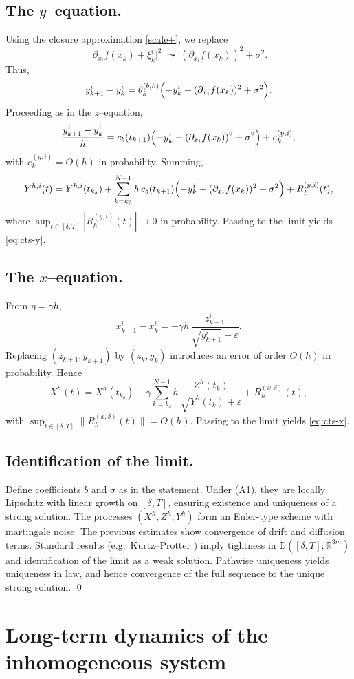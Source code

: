 \documentclass[11pt, a4paper,leqno]{amsart}
\theoremstyle{definition}
\numberwithin{equation}{section}
\begin{document}
\subsection{The $y$–equation.}
Using the closure approximation \eqref{scale+}, we replace
\[
\bigl|\partial_{x_i}f(x_k)+\xi_k^i\bigr|^2
\;\leadsto\;
(\partial_{x_i}f(x_k))^2+\sigma^2.
\]
Thus,
\[
y_{k+1}^i-y_k^i
=
\theta_k^{(b,h)}\Bigl(-y_k^i+(\partial_{x_i}f(x_k))^2+\sigma^2\Bigr).
\]
Proceeding as in the $z$–equation,
\[
\frac{y_{k+1}^i-y_k^i}{h}
=
c_b(t_{k+1})\Bigl(-y_k^i+(\partial_{x_i}f(x_k))^2+\sigma^2\Bigr)
+ e_k^{(y,i)},
\]
with $e_k^{(y,i)}=O(h)$ in probability. Summing,
\[
Y^{h,i}(t)
=
Y^{h,i}(t_{k_\delta})
+\sum_{k=k_\delta}^{N-1} h\,c_b(t_{k+1})\Bigl(-y_k^i+(\partial_{x_i}f(x_k))^2+\sigma^2\Bigr)
+R_h^{(y,i)}(t),
\]
where $\sup_{t\in[\delta,T]}|R_h^{(y,i)}(t)|\to0$ in probability. Passing to the limit yields \eqref{eq:cts-y}.

\subsection{The $x$–equation.}
From $\eta=\gamma h$,
\[
x_{k+1}^i-x_k^i = -\gamma h\,\frac{z_{k+1}^i}{\sqrt{y_{k+1}^i}+\varepsilon}.
\]
Replacing $(z_{k+1},y_{k+1})$ by $(z_k,y_k)$ introduces an error of order $O(h)$ in probability. Hence
\[
X^h(t)
=
X^h(t_{k_\delta})
-\gamma\sum_{k=k_\delta}^{N-1} h\,\frac{Z^h(t_k)}{\sqrt{Y^h(t_k)}+\varepsilon}
+R_h^{(x,\delta)}(t),
\]
with $\sup_{t\in[\delta,T]}\|R_h^{(x,\delta)}(t)\|=O(h)$. Passing to the limit yields \eqref{eq:cts-x}.

\subsection{Identification of the limit.}
Define coefficients $b$ and $\sigma$ as in the statement. Under (A1), they are locally Lipschitz with linear growth on $[\delta,T]$, ensuring existence and uniqueness of a strong solution. The processes $(X^h,Z^h,Y^h)$ form an Euler-type scheme with martingale noise. The previous estimates show convergence of drift and diffusion terms. Standard results (e.g.\ Kurtz–Protter \cite{kurtz-protter}) imply tightness in $\mathbb{D}([\delta,T];\mathbb{R}^{3m})$ and identification of the limit as a weak solution. Pathwise uniqueness yields uniqueness in law, and hence convergence of the full sequence to the unique strong solution. \qed

\section{Long-term dynamics of the inhomogeneous system}\label{LLD}
\end{document}
